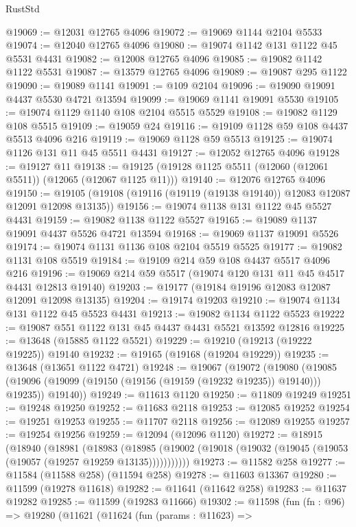 \begin{lexlean}{RustStd}
\begin{coremodule}
@19069 := @12031 @12765 @4096
@19072 := @19069 @1144 @2104 @5533
@19074 := @12040 @12765 @4096
@19080 := @19074 @1142 @131 @1122 @45 @5531 @4431
@19082 := @12008 @12765 @4096
@19085 := @19082 @1142 @1122 @5531
@19087 := @13579 @12765 @4096
@19089 := @19087 @295 @1122
@19090 := @19089 @1141
@19091 := @109 @2104
@19096 := @19090 @19091 @4437 @5530 @4721 @13594
@19099 := @19069 @1141 @19091 @5530
@19105 := @19074 @1129 @1140 @108 @2104 @5515 @5529
@19108 := @19082 @1129 @108 @5515
@19109 := @19059 @24
@19116 := @19109 @1128 @59 @108 @4437 @5513 @4096 @216
@19119 := @19069 @1128 @59 @5513
@19125 := @19074 @1126 @131 @11 @45 @5511 @4431
@19127 := @12052 @12765 @4096
@19128 := @19127 @11
@19138 := @19125 (@19128 @1125 @5511 (@12060 (@12061 @5511)) (@12065 (@12067 @1125 @11)))
@19140 := @12076 @12765 @4096
@19150 := @19105 (@19108 (@19116 (@19119 (@19138 @19140)) @12083 @12087 @12091 @12098 @13135))
@19156 := @19074 @1138 @131 @1122 @45 @5527 @4431
@19159 := @19082 @1138 @1122 @5527
@19165 := @19089 @1137 @19091 @4437 @5526 @4721 @13594
@19168 := @19069 @1137 @19091 @5526
@19174 := @19074 @1131 @1136 @108 @2104 @5519 @5525
@19177 := @19082 @1131 @108 @5519
@19184 := @19109 @214 @59 @108 @4437 @5517 @4096 @216
@19196 := @19069 @214 @59 @5517 (@19074 @120 @131 @11 @45 @4517 @4431 @12813 @19140)
@19203 := @19177 (@19184 @19196 @12083 @12087 @12091 @12098 @13135)
@19204 := @19174 @19203
@19210 := @19074 @1134 @131 @1122 @45 @5523 @4431
@19213 := @19082 @1134 @1122 @5523
@19222 := @19087 @551 @1122 @131 @45 @4437 @4431 @5521 @13592 @12816
@19225 := @13648 (@15885 @1122 @5521)
@19229 := @19210 (@19213 (@19222 @19225)) @19140
@19232 := @19165 (@19168 (@19204 @19229))
@19235 := @13648 (@13651 @1122 @4721)
@19248 := @19067
    (@19072
      (@19080
        (@19085 (@19096 (@19099 (@19150 (@19156 (@19159 (@19232 @19235)) @19140))) @19235))
        @19140))
@19249 := @11613 @1120
@19250 := @11809 @19249
@19251 := @19248 @19250
@19252 := @11683 @2118
@19253 := @12085 @19252
@19254 := @19251 @19253
@19255 := @11707 @2118
@19256 := @12089 @19255
@19257 := @19254 @19256
@19259 := @12094 (@12096 @1120)
@19272 := @18915
    (@18940
      (@18981
        (@18983
          (@18985 (@19002 (@19018 (@19032 (@19045 (@19053 (@19057 (@19257 @19259 @13135)))))))))))
@19273 := @11582 @258
@19277 := @11584 (@11588 @258) (@11594 @258)
@19278 := @11603 @13367
@19280 := @11599 (@19278 @11618)
@19282 := @11641 (@11642 @258)
@19283 := @11637 @19282
@19285 := @11599 (@19283 @11666)
@19302 := @11598
    (fun (fn : @96) =>
    @19280
      (@11621
        (@11624
          (fun (params : @11623) =>

\end{coremodule}
\end{lexlean}
